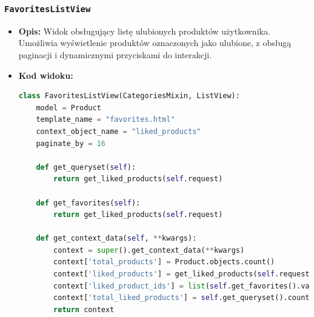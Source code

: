 \documentclass[12pt,a4paper,oneside]{article}
\theoremstyle{definition}
\numberwithin{equation}{section}
\begin{document}
\subsubsection*{\texttt{FavoritesListView}}
\begin{itemize}
    \item \textbf{Opis:} Widok obsługujący listę ulubionych produktów użytkownika. Umożliwia wyświetlenie produktów oznaczonych jako ulubione,
    z obsługą paginacji i dynamicznymi przyciskami do interakcji.
    \item \textbf{Kod widoku:}
    \begin{lstlisting}[language=Python, caption=\texttt{FavoritesListView}]
class FavoritesListView(CategoriesMixin, ListView):
    model = Product
    template_name = "favorites.html"
    context_object_name = "liked_products"
    paginate_by = 16

    def get_queryset(self):
        return get_liked_products(self.request)

    def get_favorites(self):
        return get_liked_products(self.request)

    def get_context_data(self, **kwargs):
        context = super().get_context_data(**kwargs)
        context['total_products'] = Product.objects.count()
        context['liked_products'] = get_liked_products(self.request)
        context['liked_product_ids'] = list(self.get_favorites().values_list('id', flat=True))
        context['total_liked_products'] = self.get_queryset().count()
        return context
    \end{lstlisting}


\end{itemize}
\end{document}
